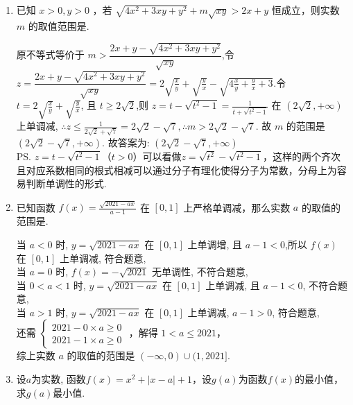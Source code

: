 \begin{enumerate}
    \item 已知 $x>0, y>0$ ，若 $\sqrt{4 x^{2}+3 x y+y^{2}}+m \sqrt{x y}>2 x+y$ 恒成立，则实数 $m$ 的取值范围是.
    \begin{jieda}
    原不等式等价于 $m>\dfrac{2 x+y-\sqrt{4 x^{2}+3 x y+y^{2}}}{\sqrt{x y}}$,令 $z=\dfrac{2 x+y-\sqrt{4 x^{2}+3 x y+y^{2}}}{\sqrt{x y}}=2 \sqrt{\frac{x}{y}}+\sqrt{\frac{y}{x}}-\sqrt{4 \frac{x}{y}+\frac{y}{x}+3}$.令 $t=2 \sqrt{\frac{x}{y}}+\sqrt{\frac{y}{x}}$, 且 $t \geq 2 \sqrt{2}$,则 $z=t-\sqrt{t^{2}-1}=\frac{1}{t+\sqrt{t^{2}-1}}$ 在 $(2 \sqrt{2},+\infty)$ 上单调减, $\therefore z \leq \frac{1}{2 \sqrt{2}+\sqrt{7}}=2 \sqrt{2}-\sqrt{7}, \therefore m>2 \sqrt{2}-\sqrt{7}$.
    故 $m$ 的范围是 $(2 \sqrt{2}-\sqrt{7},+\infty)$.
    故答案为: $(2 \sqrt{2}-\sqrt{7},+\infty)$ \\
    \ps $z = t - \sqrt{t^2-1}$（$t > 0$）可以看做$z = \sqrt{t^2} - \sqrt{t^2-1}$，这样的两个齐次且对应系数相同的根式相减可以通过分子有理化使得分子为常数，分母上为容易判断单调性的形式.
    \end{jieda}
    \item 已知函数 $f(x)=\frac{\sqrt{2021-a x}}{a-1}$ 在 $[0,1]$ 上严格单调减，那么实数 $a$ 的取值的范围是\blkda[3]{$(-\infty, 0) \cup(1,2021]$}.
    \begin{jieda}
    当 $a<0$ 时, $y=\sqrt{2021-a x}$ 在 $[0,1]$ 上单调增, 且 $a-1<0$,所以 $f(x)$ 在 $[0,1]$ 上单调减, 符合题意,\\
    当 $a=0$ 时, $f(x)=-\sqrt{2021}$ 无单调性, 不符合题意,\\
    当 $0<a<1$ 时, $y=\sqrt{2021-a x}$ 在 $[0,1]$ 上单调减, 且 $a-1<0$, 不符合题意,\\
    当 $a>1$ 时, $y=\sqrt{2021-a x}$ 在 $[0,1]$ 上单调减, $a-1>0$, 符合题意,\\
    还需 $\left\{\begin{array}{l}2021-0 \times a \geq 0 \\ 2021-1 \times a \geq 0\end{array}\right.$ ，解得 $1<a \leq 2021 ，$\\
    综上实数 $a$ 的取值的范围是 $(-\infty, 0) \cup(1,2021]$.
    \end{jieda}
    \clearpage
\item 设$a$为实数, 函数$f(x)=x^2+|x-a|+1$，设$g(a)$为函数$f(x)$的最小值，求$g(a)$最小值.
\end{enumerate}
